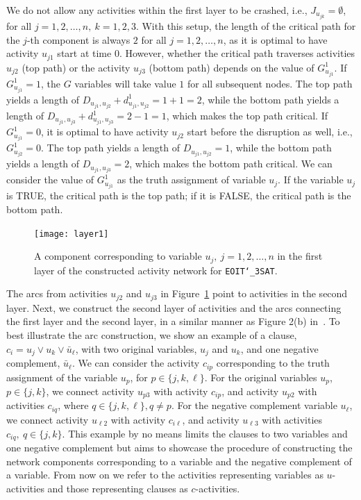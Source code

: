 \documentclass[11pt]{article}
\newcommand{\noi}{\noindent}
\begin{document}
		We do not allow any activities within the first layer to be crashed, i.e., \(J_{u_{jk}} = \emptyset\), for all \(j = 1,2,\dots, n,\ k = 1,2,3\). With this setup, the length of the critical path for the \(j\)-th component is always \(2\) for all \(j = 1,2,\dots,n\), as it is optimal to have activity \(u_{j1}\) start at time \(0\). However, whether the critical path traverses activities \(u_{j2}\) (top path) or the activity \(u_{j3}\) (bottom path) depends on the value of \(G^1_{u_{j1}}\). If \(G^1_{u_{j1}} = 1\), the \(G\) variables will take value \(1\) for all subsequent nodes. The top path yields a length of \(D_{u_{j1},u_{j2}} + d^1_{u_{j1},u_{j2}} = 1 + 1 = 2\), while the bottom path yields a length of \(D_{u_{j1},u_{j3}} + d^1_{u_{j1},u_{j3}} = 2 - 1 = 1\), which makes the top path critical. If \(G^1_{u_{j1}} = 0\), it is optimal to have activity \(u_{j2}\) start before the disruption as well, i.e., \(G^1_{u_{j2}} = 0\). The top path yields a length of \(D_{u_{j1},u_{j2}} = 1\), while the bottom path yields a length of \(D_{u_{j1},u_{j3}} = 2\), which makes the bottom path critical. We can consider the value of \(G^1_{u_{j1}}\) as the truth assignment of variable \(u_j\). If the variable \(u_j\) is TRUE, the critical path is the top path; if it is FALSE, the critical path is the bottom path. 
		\begin{figure}[H]
			\centering
			\texttt{[image: layer1]}
			\caption{A component corresponding to variable \(u_j,\ j = 1,2,\dots, n\) in the first layer of the constructed activity network for \texttt{EOIT\char`_3SAT}.}
			\label{fig:layer1}
		\end{figure}
		\noi The arcs from activities \(u_{j2}\) and \(u_{j3}\) in Figure~\ref{fig:layer1} point to activities in the second layer. Next, we construct the second layer of activities and the arcs connecting the first layer and the second layer, in a similar manner as Figure 2(b) in~\cite{de1997complexity}. To best illustrate the arc construction, we show an example of a clause, \(c_i = u_j \vee u_k \vee \bar{u}_{\ell}\), with two original variables, \(u_j\) and \(u_k\), and one negative complement, \(\bar{u}_{\ell}\). We can consider the activity \(c_{ip}\) corresponding to the truth assignment of the variable \(u_p\), for \(p \in \{j,k,\ell\}\). For the original variables \(u_p\), \(p \in \{j,k\}\), we connect activity \(u_{p3}\) with activity \(c_{ip}\), and activity \(u_{p2}\) with activities \(c_{iq}\), where \(q \in \{j,k,\ell\}, q \neq p\). For the negative complement variable \(u_\ell\), we connect activity \(u_{\ell 2}\) with activity \(c_{i \ell}\), and activity \(u_{\ell 3}\) with activities \(c_{iq},\ q \in \{j,k\}\). This example by no means limits the clauses to two variables and one negative complement but aims to showcase the procedure of constructing the network components corresponding to a variable and the negative complement of a variable. From now on we refer to the activities representing variables as \(u\)-activities and those representing clauses as \(c\)-activities.\\
\end{document}
